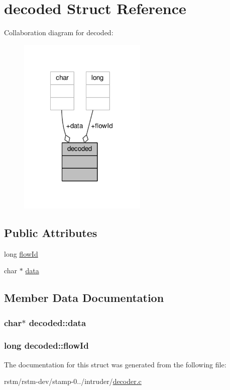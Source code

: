 \hypertarget{structdecoded}{\section{decoded Struct Reference}
\label{structdecoded}
}


Collaboration diagram for decoded\-:
\nopagebreak
\begin{figure}[H]
\begin{center}
\leavevmode
\includegraphics[width=173pt]{structdecoded__coll__graph}
\end{center}
\end{figure}
\subsection*{Public Attributes}
\begin{DoxyCompactItemize}
\item 
long \hyperlink{structdecoded_a9be7b7d19b6e71e0b5ad14b8c2a98acf}{flow\-Id}
\item 
char $\ast$ \hyperlink{structdecoded_ac2e65b3da03a68e77c35d908adafeebc}{data}
\end{DoxyCompactItemize}


\subsection{Member Data Documentation}
\hypertarget{structdecoded_ac2e65b3da03a68e77c35d908adafeebc}{
\subsubsection[{data}]{\setlength{\rightskip}{0pt plus 5cm}char$\ast$ decoded\-::data}}\label{structdecoded_ac2e65b3da03a68e77c35d908adafeebc}
\hypertarget{structdecoded_a9be7b7d19b6e71e0b5ad14b8c2a98acf}{
\subsubsection[{flow\-Id}]{\setlength{\rightskip}{0pt plus 5cm}long decoded\-::flow\-Id}}\label{structdecoded_a9be7b7d19b6e71e0b5ad14b8c2a98acf}


The documentation for this struct was generated from the following file\-:\begin{DoxyCompactItemize}
\item 
rstm/rstm-\/dev/stamp-\/0../intruder/\hyperlink{decoder_8c}{decoder.\-c}\end{DoxyCompactItemize}
